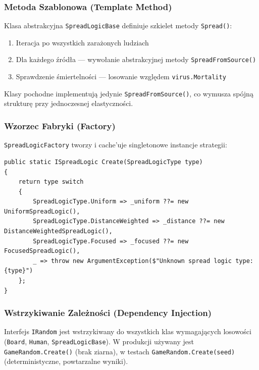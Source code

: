 \documentclass[a4paper,12pt]{article}
\begin{document}
\subsubsection{Metoda Szablonowa (Template Method)}

Klasa abstrakcyjna \texttt{SpreadLogicBase} definiuje szkielet metody \texttt{Spread()}:

\begin{enumerate}
    \item Iteracja po wszystkich zarażonych ludziach
    \item Dla każdego źródła --- wywołanie abstrakcyjnej metody \texttt{SpreadFromSource()}
    \item Sprawdzenie śmiertelności --- losowanie względem \texttt{virus.Mortality}
\end{enumerate}

Klasy pochodne implementują jedynie \texttt{SpreadFromSource()}, co wymusza spójną strukturę
przy jednoczesnej elastyczności.

\subsubsection{Wzorzec Fabryki (Factory)}

\texttt{SpreadLogicFactory} tworzy i cache'uje singletonowe instancje strategii:

\begin{lstlisting}[language={[Sharp]C}]
public static ISpreadLogic Create(SpreadLogicType type)
{
    return type switch
    {
        SpreadLogicType.Uniform => _uniform ??= new UniformSpreadLogic(),
        SpreadLogicType.DistanceWeighted => _distance ??= new DistanceWeightedSpreadLogic(),
        SpreadLogicType.Focused => _focused ??= new FocusedSpreadLogic(),
        _ => throw new ArgumentException($"Unknown spread logic type: {type}")
    };
}
\end{lstlisting}

\subsubsection{Wstrzykiwanie Zależności (Dependency Injection)}

Interfejs \texttt{IRandom} jest wstrzykiwany do wszystkich klas wymagających losowości
(\texttt{Board}, \texttt{Human}, \texttt{SpreadLogicBase}). W produkcji używany jest
\texttt{GameRandom.Create()} (brak ziarna), w testach \texttt{GameRandom.Create(seed)}
(deterministyczne, powtarzalne wyniki).
\end{document}
